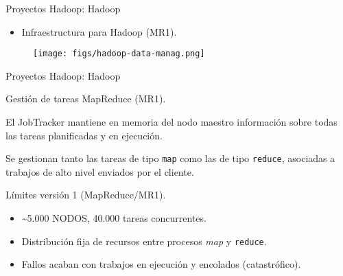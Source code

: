 
\begin{frame}{Proyectos Hadoop: Hadoop}
\begin{itemize}
 \item Infraestructura para Hadoop (MR1).
\end{itemize}

\begin{figure}
 \centering
 \texttt{[image: figs/hadoop-data-manag.png]}
\end{figure}

\end{frame}


\begin{frame}{Proyectos Hadoop: Hadoop}
 \begin{wideitemize}
  \item Gestión de tareas MapReduce (MR1).
  \item El JobTracker mantiene en memoria del nodo maestro información sobre todas
  las tareas planificadas y en ejecución.
  \item Se gestionan tanto las tareas de tipo \texttt{map} como las de tipo \texttt{reduce}, 
  asociadas a trabajos de alto nivel enviados por el cliente.
  \item Límites versión 1 (MapReduce/MR1).
  \begin{itemize}
   \item \textasciitilde 5.000 NODOS, 40.000 tareas concurrentes.
   \item Distribución fija de recursos entre procesos \textit{map} y \texttt{reduce}.
   \item Fallos acaban con trabajos en ejecución y encolados (catastrófico).
  \end{itemize}

 \end{wideitemize}

\end{frame}


